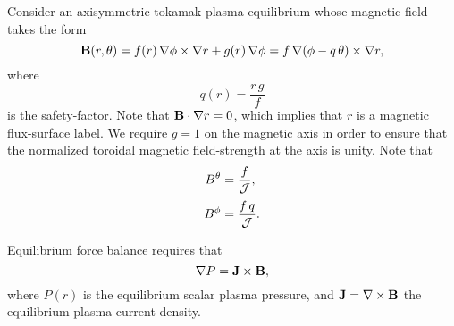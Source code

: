 \documentclass[12pt,prb,aps,notitlepage]{revtex4-1}
\begin{document}
Consider an axisymmetric tokamak plasma equilibrium whose magnetic field takes the form
\begin{equation}
{\bf B}(r,\theta) = f(r)\,\nabla\phi\times \nabla r + g(r)\,\nabla\phi = f\,\nabla(\phi-q\,\theta)\times \nabla r,
\end{equation}
where
\begin{equation}\label{q}
q(r) = \frac{r\,g}{f}
\end{equation}
is the safety-factor. Note that ${\bf B}\cdot\nabla r=0$, which implies that $r$ is a magnetic flux-surface label.
We require $g=1$ on the magnetic axis in order to ensure that the normalized toroidal magnetic field-strength at the  axis is unity.  
Note that 
\begin{align}
B^\theta&= \frac{f}{\cal J},\\[0.5ex]
B^\phi &=\frac{f\,q}{\cal J}.
\end{align}

Equilibrium force balance requires that
\begin{equation}\label{e15c}
 \nabla P={\bf J}\times {\bf B},
\end{equation}
where $P(r)$ is the equilibrium scalar plasma pressure, and ${\bf J}=\nabla\times {\bf B}$ the equilibrium plasma current density. 
\end{document}
